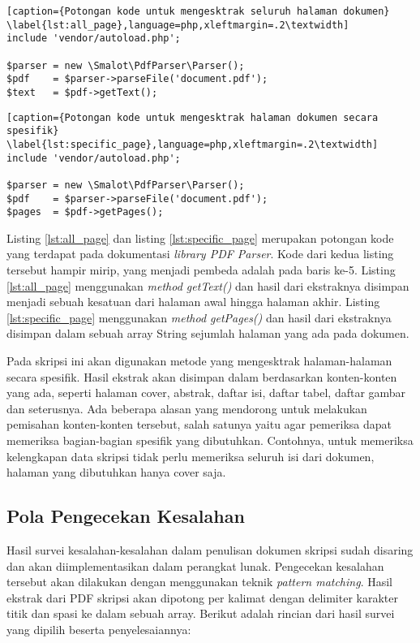 \begin{lstlisting}[caption={Potongan kode untuk mengesktrak seluruh halaman dokumen}	\label{lst:all_page},language=php,xleftmargin=.2\textwidth] 
include 'vendor/autoload.php';
	
$parser = new \Smalot\PdfParser\Parser();
$pdf    = $parser->parseFile('document.pdf');
$text   = $pdf->getText();
\end{lstlisting}
	
\begin{lstlisting}[caption={Potongan kode untuk mengesktrak halaman dokumen secara spesifik}
\label{lst:specific_page},language=php,xleftmargin=.2\textwidth] 
include 'vendor/autoload.php';

$parser = new \Smalot\PdfParser\Parser();
$pdf    = $parser->parseFile('document.pdf');
$pages  = $pdf->getPages();
\end{lstlisting}
\medskip

Listing \ref{lst:all_page} dan listing \ref{lst:specific_page} merupakan potongan kode yang terdapat pada dokumentasi \textit{library PDF Parser}. Kode dari kedua listing tersebut hampir mirip, yang menjadi pembeda adalah pada baris ke-5. Listing \ref{lst:all_page} menggunakan \textit{method getText()} dan hasil dari ekstraknya disimpan menjadi sebuah kesatuan dari halaman awal hingga halaman akhir. Listing \ref{lst:specific_page} menggunakan \textit{method getPages()} dan hasil dari ekstraknya disimpan dalam sebuah array String sejumlah halaman yang ada pada dokumen.

Pada skripsi ini akan digunakan metode yang mengesktrak halaman-halaman secara spesifik. Hasil ekstrak akan disimpan dalam berdasarkan konten-konten yang ada, seperti halaman cover, abstrak, daftar isi, daftar tabel, daftar gambar dan seterusnya. Ada beberapa alasan yang mendorong untuk melakukan pemisahan konten-konten tersebut, salah satunya yaitu agar pemeriksa dapat memeriksa bagian-bagian spesifik yang dibutuhkan. Contohnya, untuk memeriksa kelengkapan data skripsi tidak perlu memeriksa seluruh isi dari dokumen, halaman yang dibutuhkan hanya cover saja. 

\subsection{Pola Pengecekan Kesalahan}
Hasil survei kesalahan-kesalahan dalam penulisan dokumen skripsi sudah disaring dan akan diimplementasikan dalam perangkat lunak. Pengecekan kesalahan tersebut akan dilakukan dengan menggunakan teknik \textit{pattern matching}. Hasil ekstrak dari PDF skripsi akan dipotong per kalimat dengan delimiter karakter titik dan spasi ke dalam sebuah array. Berikut adalah rincian dari hasil survei yang dipilih beserta penyelesaiannya:

